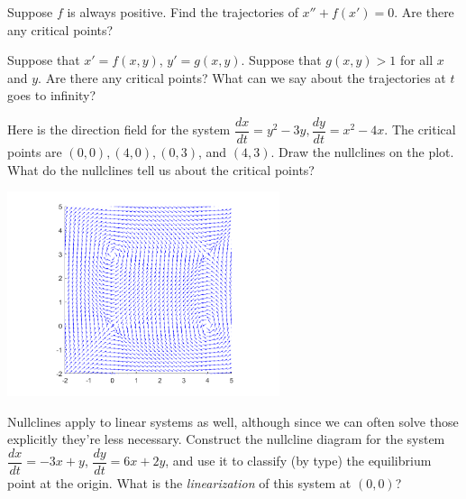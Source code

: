 \documentclass{ximera}
\begin{document}
\begin{exercise}
    Suppose $f$ is always positive. Find the trajectories of $x''+f(x') = 0$. Are there any critical points?
\end{exercise}

\begin{exercise}
    Suppose that $x' = f(x,y)$, $y' = g(x,y)$.  Suppose that $g(x,y) > 1$ for all $x$ and $y$.  Are there any critical points?  What can we say about the trajectories at $t$ goes to infinity?
\end{exercise}

\begin{exercise}
    Here is the direction field for the system $\dfrac{dx}{dt}=y^2-3y, \dfrac{dy}{dt}=x^2-4x$. The critical points are $(0,0), (4,0), (0,3)$, and $(4,3)$. Draw the nullclines on the plot. What do the nullclines tell us about the critical points?
    
    \begin{center}
        \includegraphics[width=0.6\textwidth]{figures/NLVF_1.png}
    \end{center}
\end{exercise}
%

\begin{exercise}
    Nullclines apply to linear systems as well, although since we can often solve those explicitly they're less necessary. Construct the nullcline diagram for the system $\dfrac{dx}{dt}=-3x+y$, $\dfrac{dy}{dt}=6x+2y$, and use it to classify (by type) the equilibrium point at the origin. What is the {\it linearization} of this system at $(0,0)$?
\end{exercise}
\end{document}
